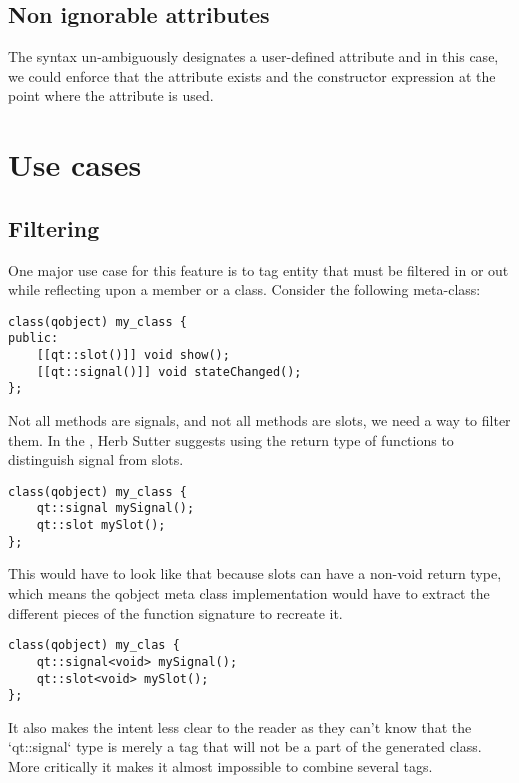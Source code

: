 \documentclass{wg21}
\begin{document}
\subsection{Non ignorable attributes}

The syntax  un-ambiguously designates a user-defined attribute and in this case, we could enforce that the attribute exists and the constructor expression at the point where the attribute is used.

\section{Use cases}

\subsection{Filtering}

One major use case for this feature is to tag entity that must be filtered in or out while reflecting upon a member or a class.
Consider the following meta-class:

\begin{verbatim}
class(qobject) my_class {
public:
    [[qt::slot()]] void show();
    [[qt::signal()]] void stateChanged();
};

\end{verbatim}

Not all methods are signals, and not all methods are slots, we need a way to filter them.
In the \cite{P0707}, Herb Sutter suggests using the return type of functions to distinguish signal from slots.

\begin{verbatim}
class(qobject) my_class {
    qt::signal mySignal();
    qt::slot mySlot();
};
\end{verbatim}

This would have to look like that because slots can have a non-void return type, which means the qobject meta class implementation would have to extract the different pieces of the function signature to recreate it.

\begin{verbatim}
class(qobject) my_clas {
    qt::signal<void> mySignal();
    qt::slot<void> mySlot();
};
\end{verbatim}

It also makes the intent less clear to the reader as they can't know that the `qt::signal` type is merely a tag that will not be a part of the generated class.
More critically it makes it almost impossible to combine several tags.
\end{document}
